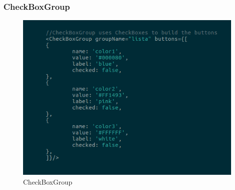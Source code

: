 \subsubsection{CheckBoxGroup}
\begin{figure}[H]
	\centering
	\includegraphics[width=14cm]{../../documenti/UserManualFramework/framework_view/10framework_view_check_group.png}
	\caption{CheckBoxGroup}
\end{figure}
